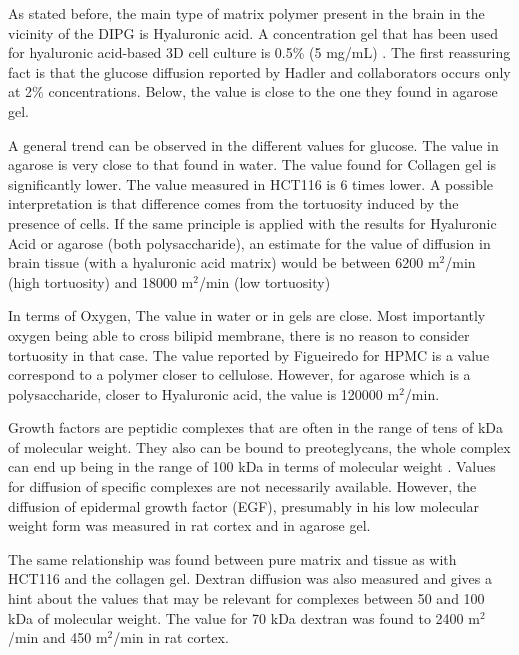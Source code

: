 \documentclass[11pt,a4paper]{article}
\begin{document}
As stated before, the main type of matrix polymer present in the brain in the vicinity of the DIPG is Hyaluronic acid. A concentration gel that has been used for hyaluronic acid-based 3D cell culture is 0.5\% (5 mg/mL) \cite{Xiao2018}. The first reassuring fact is that the glucose diffusion reported by Hadler and collaborators occurs only at 2\% concentrations.\cite{Hadler1980} Below, the value is close to the one they found in agarose gel.

A general trend can be observed in the different values for glucose. The value in agarose is very close to that found in water. The value found for Collagen gel is significantly lower. The value measured in HCT116 is 6 times lower. A possible interpretation is that difference comes from the tortuosity induced by the presence of cells. If the same principle is applied with the results for Hyaluronic Acid or agarose (both polysaccharide), an estimate for the value of diffusion in brain tissue (with a hyaluronic acid matrix) would be between 6200  \textmu m$^2$/min (high tortuosity) and 18000  \textmu m$^2$/min (low tortuosity)

In terms of Oxygen, The value in water or in gels are close. Most importantly oxygen being able to cross bilipid membrane, there is no reason to consider tortuosity in that case.\cite{NatureMembrane} The value reported by Figueiredo for HPMC is a value correspond to a polymer closer to cellulose. However, for agarose which is a polysaccharide, closer to Hyaluronic acid, the value is 120000 \textmu m$^2$/min. 

Growth factors are peptidic complexes that are often in the range of tens of kDa of molecular weight. They also can be bound to preoteglycans, the whole complex can end up being in the range of 100 kDa in terms of molecular weight \cite{Taylor1970}. Values for diffusion of specific complexes are not necessarily available. However, the diffusion of epidermal growth factor (EGF), presumably in his low molecular weight form was measured in rat cortex and in agarose gel. 

The same relationship was found between pure matrix and tissue as with HCT116 and the collagen gel. Dextran diffusion was also measured and gives a hint about the values that may be relevant for complexes between 50 and 100 kDa of molecular weight. The value for  70 kDa dextran was found to 2400 \textmu m$^2$/min and 450 \textmu m$^2$/min in rat cortex.
\end{document}
